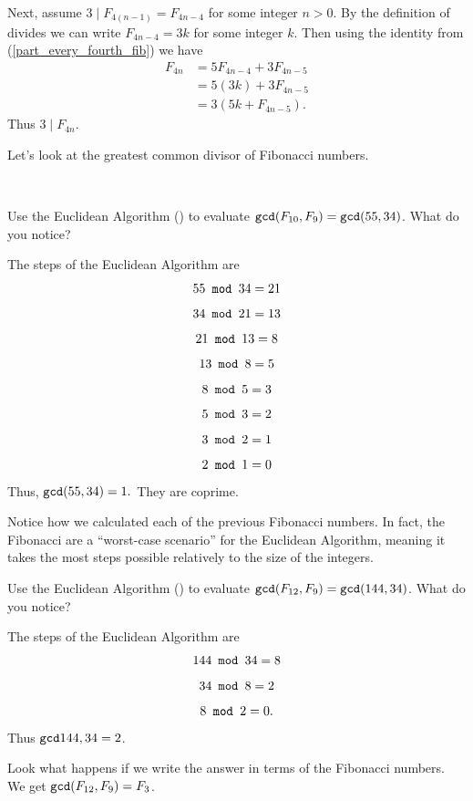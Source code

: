 \begin{exam}
\begin{apart}
\begin{soln}
            Next, assume $3 \mid F_{4(n-1)} = F_{4n-4}$ for some integer $n > 0$.  By the definition of divides we can write $F_{4n-4}=3k$ for some integer $k$.  Then using the identity from (\ref{part_every_fourth_fib}) we have
                \begin{align*}
                    F_{4n} & = 5 F_{4n-4} + 3F_{4n-5} \\
                    & = 5(3k) + 3F_{4n-5} \\
                    & = 3(5k+F_{4n-5}).
                \end{align*}
            Thus $3 \mid F_{4n}$.
        \end{soln}            
    \end{apart}
\end{exam}

Let's look at the greatest common divisor of Fibonacci numbers.

\begin{exam}
\label{exam_fib_gcd}
~
    \begin{apart}
        \item Use the Euclidean Algorithm () to evaluate $\texttt{gcd}(F_{10},F_9)=\texttt{gcd}(55,34)$. What do you notice? 
            \begin{soln}
                The steps of the Euclidean Algorithm are    
                $$55 \texttt{ mod } 34 = 21$$
                $$34 \texttt{ mod } 21 = 13$$
                $$21 \texttt{ mod } 13 = 8$$
                $$13 \texttt{ mod } 8 = 5$$
                $$8 \texttt{ mod } 5 = 3$$
                $$5 \texttt{ mod } 3 = 2$$
                $$3 \texttt{ mod } 2 = 1$$
                $$2 \texttt{ mod } 1 = 0$$
                Thus, $\texttt{gcd}(55,34)=1.$  They are coprime.  

                Notice how we calculated each of the previous Fibonacci numbers.  In fact, the Fibonacci are a ``worst-case scenario'' for the Euclidean Algorithm, meaning it takes the most steps possible relatively to the size of the integers.
            \end{soln}
        \item \label{part_gcd14434} Use the Euclidean Algorithm () to evaluate $\texttt{gcd}(F_{12},F_9)=\texttt{gcd}(144,34)$. What do you notice?
            \begin{soln}
                The steps of the Euclidean Algorithm are
                $$144 \texttt{ mod } 34 = 8$$
                $$34 \texttt{ mod } 8 = 2$$
                $$8 \texttt{ mod } 2 = 0.$$
                Thus $\texttt{gcd}{144,34} = 2$.  

                Look what happens if we write the answer in terms of the Fibonacci numbers.  We get $\texttt{gcd}(F_{12},F_9)=F_3$.
            \end{soln}
    \end{apart}
\end{exam}

